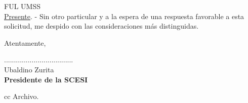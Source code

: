 \documentclass[11pt,letterpaper]{letter}
\begin{document}
\begin{letter}{ FUL UMSS \\ \underline {Presente}. -}
Sin otro particular y a la espera de una respuesta favorable a esta solicitud, me despido con las consideraciones más distinguidas.

Atentamente,

\vspace{0.50cm}

\begin{center}
...................................\\
Ubaldino Zurita\\
{\bfseries Presidente de la SCESI}
\end{center}
cc Archivo.
\end{letter}
\end{document}
